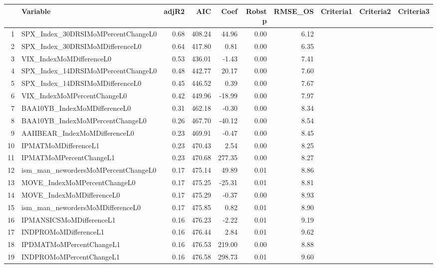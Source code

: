 \begin{longtable}{rlrrrrrlll}
  \hline
 & Variable & adjR2 & AIC & Coef & Robst p & RMSE\_OS & Criteria1 & Criteria2 & Criteria3 \\ 
  \hline
1 & SPX\_Index\_30DRSIMoMPercentChangeL0 & 0.68 & 408.24 & 44.96 & 0.00 & 6.12 &  &  &  \\ 
  2 & SPX\_Index\_30DRSIMoMDifferenceL0 & 0.64 & 417.80 & 0.81 & 0.00 & 6.35 &  &  &  \\ 
  3 & VIX\_IndexMoMDifferenceL0 & 0.53 & 436.01 & -1.43 & 0.00 & 7.41 &  &  &  \\ 
  4 & SPX\_Index\_14DRSIMoMPercentChangeL0 & 0.48 & 442.77 & 20.17 & 0.00 & 7.60 &  &  &  \\ 
  5 & SPX\_Index\_14DRSIMoMDifferenceL0 & 0.45 & 446.52 & 0.39 & 0.00 & 7.67 &  &  &  \\ 
  6 & VIX\_IndexMoMPercentChangeL0 & 0.42 & 449.96 & -18.99 & 0.00 & 7.97 &  &  &  \\ 
  7 & BAA10YB\_IndexMoMDifferenceL0 & 0.31 & 462.18 & -0.30 & 0.00 & 8.34 &  &  &  \\ 
  8 & BAA10YB\_IndexMoMPercentChangeL0 & 0.26 & 467.70 & -40.12 & 0.00 & 8.54 &  &  &  \\ 
  9 & AAIIBEAR\_IndexMoMDifferenceL0 & 0.23 & 469.91 & -0.47 & 0.00 & 8.45 &  &  &  \\ 
  10 & IPMATMoMDifferenceL1 & 0.23 & 470.43 & 2.54 & 0.00 & 8.25 &  &  &  \\ 
  11 & IPMATMoMPercentChangeL1 & 0.23 & 470.68 & 277.35 & 0.00 & 8.27 &  &  &  \\ 
  12 & ism\_man\_newordersMoMPercentChangeL0 & 0.17 & 475.14 & 49.89 & 0.01 & 8.86 &  &  &  \\ 
  13 & MOVE\_IndexMoMPercentChangeL0 & 0.17 & 475.25 & -25.31 & 0.01 & 8.81 &  &  &  \\ 
  14 & MOVE\_IndexMoMDifferenceL0 & 0.17 & 475.29 & -0.37 & 0.00 & 8.93 &  &  &  \\ 
  15 & ism\_man\_newordersMoMDifferenceL0 & 0.17 & 475.85 & 0.82 & 0.01 & 8.90 &  &  &  \\ 
  16 & IPMANSICSMoMDifferenceL1 & 0.16 & 476.23 & -2.22 & 0.01 & 9.19 &  &  &  \\ 
  17 & INDPROMoMDifferenceL1 & 0.16 & 476.44 & 2.84 & 0.01 & 9.62 &  &  &  \\ 
  18 & IPDMATMoMPercentChangeL1 & 0.16 & 476.53 & 219.00 & 0.00 & 8.88 &  &  &  \\ 
  19 & INDPROMoMPercentChangeL1 & 0.16 & 476.58 & 298.73 & 0.01 & 9.60 &  &  &  \\ 

\end{longtable}
